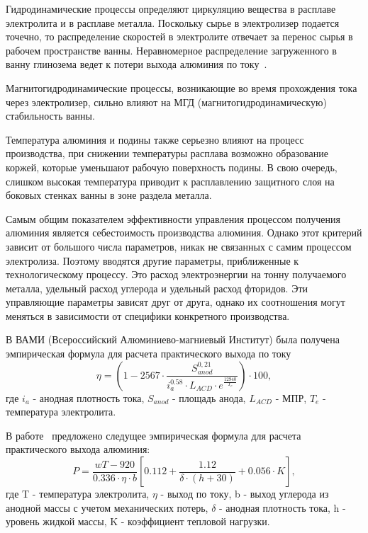 \documentclass{article}
\begin{document}
Гидродинамические процессы определяют циркуляцию вещества в расплаве электролита и в расплаве металла. Поскольку сырье в электролизер подается точечно, то распределение скоростей в электролите отвечает за перенос сырья в рабочем пространстве ванны. Неравномерное распределение загруженного в ванну глинозема ведет к потери выхода алюминия по току~\cite{litink:AE}.

Магнитогидродинамические процессы, возникающие во время прохождения тока через электролизер, сильно влияют на МГД (магнитогидродинамическую) стабильность ванны.

Температура алюминия и подины также серьезно влияют на процесс производства, при снижении температуры расплава возможно образование коржей, которые уменьшают рабочую поверхность подины. В свою очередь, слишком высокая температура приводит к расплавлению защитного слоя на боковых стенках ванны в зоне раздела металла.

Самым общим показателем эффективности управления процессом получения алюминия является себестоимость производства алюминия. Однако этот критерий зависит от большого числа параметров, никак не связанных с самим процессом электролиза. Поэтому вводятся другие параметры, приближенные к технологическому процессу. Это расход электроэнергии на тонну получаемого металла, удельный расход углерода и удельный расход фторидов. Эти управляющие параметры зависят друг от друга, однако их соотношения могут меняться в зависимости от специфики конкретного производства.

В ВАМИ (Всероссийский Алюминиево-магниевый Институт) была получена эмпирическая формула для расчета практического выхода по току~\cite{litlink:VAMI}
\begin{equation} \label{eq1}
\eta=(1-2567 \cdot \frac{S^{0,21}_{anod}}{i^{0.58}_a \cdot L_{ACD} \cdot e^{\frac{12940}{T_e}}}) \cdot 100,
\end{equation}
где $i_a$ - анодная плотность тока, $S_{anod}$ - площадь анода, $L_{ACD}$ - МПР, $T_e$ - температура электролита.

В работе~\cite{litlink:korobov} предложено следущее эмпирическая формула для расчета практического выхода алюминия:
\begin{equation} \label{eq:p}
P= \frac{wT-920}{0.336 \cdot \eta \cdot b}[0.112+\frac {1.12}{\delta \cdot (h+30)}+0.056 \cdot K],
\end{equation}
где T - температура электролита, $\eta$ - выход по току, b - выход углерода из анодной массы с учетом механических потерь, $\delta$ - анодная плотность тока, h - уровень жидкой массы, K - коэффициент тепловой нагрузки.
\end{document}
